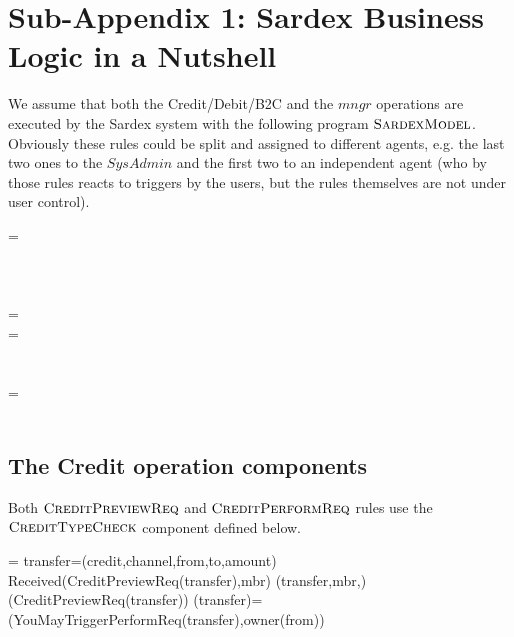 \section{Sub-Appendix 1: Sardex Business Logic in a Nutshell}
\label{sect:appendixModel}

We assume that both the Credit/Debit/B2C and the $mngr$ operations are executed by the Sardex system with the following program $\hbox{\sc SardexModel}$. Obviously these rules could be split and assigned to different agents, e.g. the last two ones to the $SysAdmin$ and the first two to an independent agent (who by those rules reacts to triggers by the users, but the rules themselves are not under user control).

\begin{asm}
 =\+
  \\
  \\
  \\
  \\
   \-
\WHERE \+
  =\+
      \\
      \-
  =\+
      \\
      \\
     \\
     \-
   =\+    
     	\\
     	\\
 \end{asm}
 
 \subsection{The Credit operation components}
 
 Both $\hbox{\sc CreditPreviewReq}$ and $ \hbox{\sc CreditPerformReq}$ rules use the $ \hbox{\sc CreditTypeCheck}$ component defined below.
 
 \begin{asm}
  =\+
    \LET transfer=(credit,channel,from,to,amount)\+
        \IF Received(CreditPreviewReq(transfer),\FROM mbr) \THEN \+   
           (transfer,mbr,)\\
            (CreditPreviewReq(transfer)) \dec\dec\-
      \WHERE \+
         (transfer)=\+
        (YouMayTriggerPerformReq(transfer),\TO owner(from))
 \end{asm}
 
